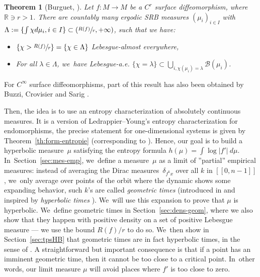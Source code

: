 \documentclass[10pt]{amsart}
\let\rC C
\newtheorem*{thm*}{Theorem}
\theoremstyle{definition}
\newcommand{\bbR}{{\mathbb{R}}}
\begin{document}
\begin{thm*}[Burguet, \cite{MR4701884}]
Let $f: M \to M$ be a $\rC^r$ surface diffeomorphism, where $\bbR \ni r > 1$.
There are countably many ergodic SRB measures $(\mu_i)_{i \in I}$ with $\Lambda := \{ \int \chi d \mu_i, i \in I \} \subset \left (\sfrac{R(f)}{r}, + \infty \right)$, such that we have:
\begin{itemize}
\item
$\left \{ \chi > \sfrac{R(f)}{r} \right \} = \{ \chi \in \Lambda \}$ Lebesgue-almost everywhere,
\item
For all $\lambda \in \Lambda$, we~have Lebesgue-a.e. $\{ \chi = \lambda \} \subset \bigcup_{i, \chi(\mu_i) = \lambda} \mathcal{B}(\mu_i)$.
\end{itemize}
\end{thm*}

For $\rC^{\infty}$ surface diffeomorphisms, part of this result has also been obtained by Buzzi, Crovisier and Sarig \cite{Buzzi_Crovisier_Sarig_2022}.

Then, the idea is to use an entropy characterization of absolutely continuous measures. It is a version of Ledrappier--Young's entropy characterization \cite{Ledrappier_Young_1985a,Ledrappier_Young_1985b} for endomorphisms, the precise statement for one-dimensional systems is given by Theorem~\ref{th:form-entropie} (corresponding to \cite[Th.\,VII.1.1]{SETE}).
Hence, our goal is to build a hyperbolic measure~$\mu$ satisfying the entropy formula $h(\mu) = \int \log |f'| \: d \mu$. In~Section~\ref{sec:mes-emp}, we~define a measure~$\mu$ as a limit of ''partial'' empirical measures: instead of averaging the Dirac measures~$\delta_{f^k x}$ over all $k$ in $[\![ 0, n-1 ]\!]$, we~only average over points of the orbit where the dynamic shows some expanding behavior, such $k$'s are called \textit{geometric times} (introduced in \cite{MR4701884} and inspired by \textit{hyperbolic times} \cite{Alves2000}). We~will use this expansion to prove that $\mu$ is hyperbolic. We~define geometric times in Section~\ref{sec:dens-geom}, where we also show that they happen with positive density on a set of positive Lebesgue measure --- we use the bound $R(f) / r$ to do so. We~then show in Section~\ref{sec:tpsHB} that geometric times are in fact hyperbolic times, in the sense of \cite{Alves2000}. A straightforward but important consequence is that if a point has an imminent geometric time, then it cannot be too close to a critical point. In~other words, our limit measure $\mu$ will avoid places where $f'$ is too close to zero.
\end{document}

